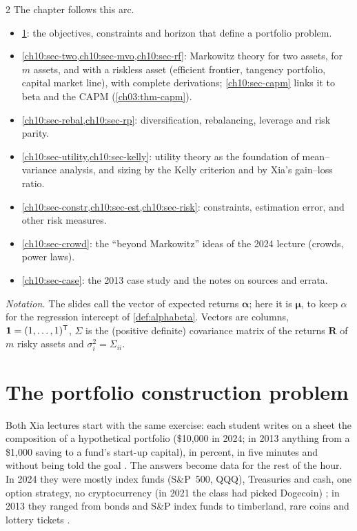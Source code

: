 \begin{paracol}{2}
The chapter follows this arc.
\begin{itemize}
  \item \cref{ch10:sec-problem}: the objectives, constraints and horizon that define a portfolio problem.
  \item \cref{ch10:sec-two,ch10:sec-mvo,ch10:sec-rf}: Markowitz theory for two assets, for $m$ assets, and with a
        riskless asset (efficient frontier, tangency portfolio, capital market line), with complete derivations;
        \cref{ch10:sec-capm} links it to beta and the CAPM (\cref{ch03:thm-capm}).
  \item \cref{ch10:sec-rebal,ch10:sec-rp}: diversification, rebalancing, leverage and risk parity.
  \item \cref{ch10:sec-utility,ch10:sec-kelly}: utility theory as the foundation of mean--variance analysis, and
        sizing by the Kelly criterion and by Xia's gain--loss ratio.
  \item \cref{ch10:sec-constr,ch10:sec-est,ch10:sec-risk}: constraints, estimation error, and other risk measures.
  \item \cref{ch10:sec-crowd}: the ``beyond Markowitz'' ideas of the 2024 lecture (crowds, power laws).
  \item \cref{ch10:sec-case}: the 2013 case study and the notes on sources and errata.
\end{itemize}
\emph{Notation.} The slides call the vector of expected returns $\bm\alpha$; here it is $\bm\mu$, to keep
$\alpha$ for the regression intercept of \cref{def:alphabeta}. Vectors are columns, $\bm 1=(1,\dots,1)^{\mathsf T}$,
$\Sigma$ is the (positive definite) covariance matrix of the returns $\bm R$ of $m$ risky assets and
$\sigma_i^2=\Sigma_{ii}$.

\section{The portfolio construction problem}\label{ch10:sec-problem}

Both Xia lectures start with the same exercise: each student writes on a sheet the composition of a
hypothetical portfolio (\$10{,}000 in 2024; in 2013 anything from a \$1{,}000 saving to a fund's start-up capital), in percent, in five minutes and
without being told the goal . The answers become data for the rest of the hour.
In 2024 they were mostly index funds (S\&P~500, QQQ), Treasuries and cash, one option strategy, no cryptocurrency
(in 2021 the class had picked Dogecoin) ; in 2013 they ranged from bonds and
S\&P index funds to timberland, rare coins and lottery tickets .


\end{paracol}
